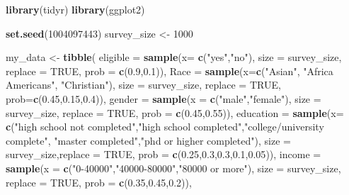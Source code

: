\documentclass[
]{article}
\newenvironment{Shaded}{\begin{snugshade}}{\end{snugshade}}
\newcommand{\DataTypeTok}[1]{\textcolor[rgb]{0.13,0.29,0.53}{#1}}
\newcommand{\DecValTok}[1]{\textcolor[rgb]{0.00,0.00,0.81}{#1}}
\newcommand{\FloatTok}[1]{\textcolor[rgb]{0.00,0.00,0.81}{#1}}
\newcommand{\KeywordTok}[1]{\textcolor[rgb]{0.13,0.29,0.53}{\textbf{#1}}}
\newcommand{\NormalTok}[1]{#1}
\newcommand{\OtherTok}[1]{\textcolor[rgb]{0.56,0.35,0.01}{#1}}
\newcommand{\StringTok}[1]{\textcolor[rgb]{0.31,0.60,0.02}{#1}}
\begin{document}
\begin{Shaded}
\begin{Highlighting}[]
\KeywordTok{library}\NormalTok{(tidyr)}
\KeywordTok{library}\NormalTok{(ggplot2)}

\KeywordTok{set.seed}\NormalTok{(}\DecValTok{1004097443}\NormalTok{)}
\NormalTok{survey_size <-}\StringTok{ }\DecValTok{1000}

\NormalTok{my_data <-}\StringTok{ }\KeywordTok{tibble}\NormalTok{(}
  \DataTypeTok{eligible =} \KeywordTok{sample}\NormalTok{(}\DataTypeTok{x=} \KeywordTok{c}\NormalTok{(}\StringTok{"yes"}\NormalTok{,}\StringTok{"no"}\NormalTok{), }\DataTypeTok{size =}\NormalTok{ survey_size,}
                    \DataTypeTok{replace =} \OtherTok{TRUE}\NormalTok{, }\DataTypeTok{prob =} \KeywordTok{c}\NormalTok{(}\FloatTok{0.9}\NormalTok{,}\FloatTok{0.1}\NormalTok{)),}
  \DataTypeTok{Race =} \KeywordTok{sample}\NormalTok{(}\DataTypeTok{x=}\KeywordTok{c}\NormalTok{(}\StringTok{"Asian"}\NormalTok{, }\StringTok{"Africa Americans"}\NormalTok{, }\StringTok{"Christian"}\NormalTok{), }\DataTypeTok{size =}\NormalTok{ survey_size, }\DataTypeTok{replace =} \OtherTok{TRUE}\NormalTok{, }\DataTypeTok{prob=}\KeywordTok{c}\NormalTok{(}\FloatTok{0.45}\NormalTok{,}\FloatTok{0.15}\NormalTok{,}\FloatTok{0.4}\NormalTok{)),}
  \DataTypeTok{gender =} \KeywordTok{sample}\NormalTok{(}\DataTypeTok{x =} \KeywordTok{c}\NormalTok{(}\StringTok{"male"}\NormalTok{,}\StringTok{"female"}\NormalTok{), }\DataTypeTok{size =}\NormalTok{ survey_size,}
               \DataTypeTok{replace =} \OtherTok{TRUE}\NormalTok{, }\DataTypeTok{prob =} \KeywordTok{c}\NormalTok{(}\FloatTok{0.45}\NormalTok{,}\FloatTok{0.55}\NormalTok{)),}
  \DataTypeTok{education =} \KeywordTok{sample}\NormalTok{(}\DataTypeTok{x=} \KeywordTok{c}\NormalTok{(}\StringTok{"high school not completed"}\NormalTok{,}\StringTok{"high school completed"}\NormalTok{,}\StringTok{"college/university complete"}\NormalTok{,}
                          \StringTok{"master completed"}\NormalTok{,}\StringTok{"phd or higher completed"}\NormalTok{), }\DataTypeTok{size =}\NormalTok{ survey_size,}\DataTypeTok{replace =} \OtherTok{TRUE}\NormalTok{, }\DataTypeTok{prob =} \KeywordTok{c}\NormalTok{(}\FloatTok{0.25}\NormalTok{,}\FloatTok{0.3}\NormalTok{,}\FloatTok{0.3}\NormalTok{,}\FloatTok{0.1}\NormalTok{,}\FloatTok{0.05}\NormalTok{)),}
  \DataTypeTok{income =} \KeywordTok{sample}\NormalTok{(}\DataTypeTok{x =} \KeywordTok{c}\NormalTok{(}\StringTok{"0-40000"}\NormalTok{,}\StringTok{"40000-80000"}\NormalTok{,}\StringTok{"80000 or more"}\NormalTok{), }\DataTypeTok{size =}\NormalTok{ survey_size, }\DataTypeTok{replace =} \OtherTok{TRUE}\NormalTok{, }\DataTypeTok{prob =} \KeywordTok{c}\NormalTok{(}\FloatTok{0.35}\NormalTok{,}\FloatTok{0.45}\NormalTok{,}\FloatTok{0.2}\NormalTok{)),}

\end{Highlighting}
\end{Shaded}
\end{document}
